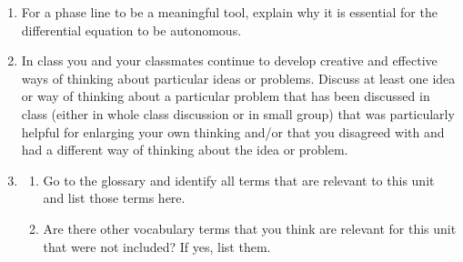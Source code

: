 \begin{enumerate}
\item For a phase line to be a meaningful tool, explain why it is essential for the differential equation to be autonomous. \label{06HWproblem5}

\item In class you and your classmates continue to develop creative and effective ways of thinking about particular ideas or problems. Discuss at least one idea or way of thinking about a particular problem that has been discussed in class (either in whole class discussion or in small group) that was particularly helpful for enlarging your own thinking and/or that you disagreed with and had a different way of thinking about the idea or problem. \label{06HWproblem6}

\item \label{06HWproblem7}
\begin{enumerate}
\item Go to the glossary and identify all terms that are relevant to this unit and list those terms here.
\item Are there other vocabulary terms that you think are relevant for this unit that were not included? If yes, list them.
\end{enumerate}

\end{enumerate}